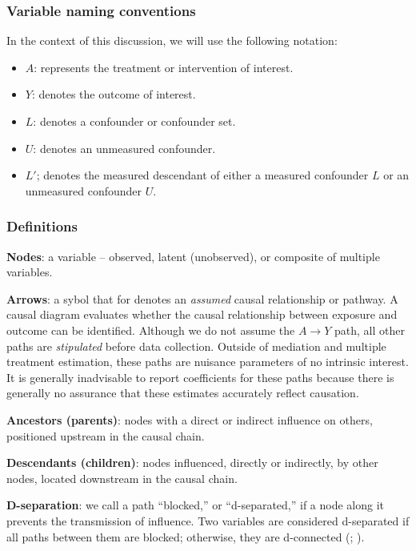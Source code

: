 \documentclass[
  singlecolumn,
  9pt]{article}
\providecommand{\tightlist}{%
  \setlength{\itemsep}{0pt}\setlength{\parskip}{0pt}}\usepackage{longtable,booktabs,array}
\begin{document}
\subsubsection{Variable naming
conventions}\label{variable-naming-conventions}

In the context of this discussion, we will use the following notation:

\begin{itemize}
\tightlist
\item
  \(A\): represents the treatment or intervention of interest.
\item
  \(Y\): denotes the outcome of interest.
\item
  \(L\): denotes a confounder or confounder set.
\item
  \(U\): denotes an unmeasured confounder.
\item
  \(L'\); denotes the measured descendant of either a measured
  confounder \(L\) or an unmeasured confounder \(U\).
\end{itemize}

\subsubsection{Definitions}\label{definitions}

\textbf{Nodes}: a variable -- observed, latent (unobserved), or
composite of multiple variables.

\textbf{Arrows}: a sybol that for denotes an \emph{assumed} causal
relationship or pathway. A causal diagram evaluates whether the causal
relationship between exposure and outcome can be identified. Although we
do not assume the \(A\to Y\) path, all other paths are \emph{stipulated}
before data collection. Outside of mediation and multiple treatment
estimation, these paths are nuisance parameters of no intrinsic
interest. It is generally inadvisable to report coefficients for these
paths because there is generally no assurance that these estimates
accurately reflect causation.

\textbf{Ancestors (parents)}: nodes with a direct or indirect influence
on others, positioned upstream in the causal chain.

\textbf{Descendants (children)}: nodes influenced, directly or
indirectly, by other nodes, located downstream in the causal chain.

\textbf{D-separation}: we call a path ``blocked,'' or ``d-separated,''
if a node along it prevents the transmission of influence. Two variables
are considered d-separated if all paths between them are blocked;
otherwise, they are d-connected (;
).
\end{document}
